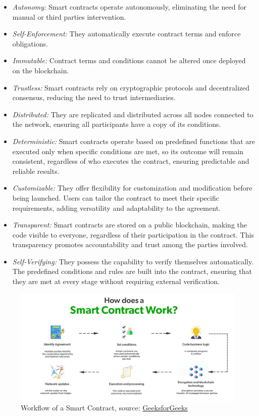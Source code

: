 \begin{itemize}
    \item \textit{Autonomy:} Smart contracts operate autonomously, eliminating the need for manual or third parties intervention.
    \item \textit{Self-Enforcement:} They automatically execute contract terms and enforce obligations.
    \item \textit{Immutable:} Contract terms and conditions cannot be altered once deployed on the blockchain.
    \item \textit{Trustless:} Smart contracts rely on cryptographic protocols and decentralized consensus, reducing the need to trust intermediaries.
    \item \textit{Distributed:} They are replicated and distributed across all nodes connected to the network, ensuring all participants have a copy of its conditions.
    \item \textit{Deterministic:} Smart contracts operate based on predefined functions that are executed only when specific conditions are met, so its outcome will remain consistent, regardless of who executes the contract, ensuring predictable and reliable results.
    \item \textit{Customizable:} They offer flexibility for customization and modification before being launched. Users can tailor the contract to meet their specific requirements, adding versatility and adaptability to the agreement.
    \item \textit{Transparent:} Smart contracts are stored on a public blockchain, making the code visible to everyone, regardless of their participation in the contract. This transparency promotes accountability and trust among the parties involved.
    \item \textit{Self-Verifying:} They possess the capability to verify themselves automatically. The predefined conditions and rules are built into the contract, ensuring that they are met at every stage without requiring external verification.\cite{sc}
    
\end{itemize}


\begin{figure}[htbp]
	\centering
	\includegraphics[scale=0.4]{figures/smart.png}  %
	\caption{Workflow of a Smart Contract, source: \href{https://www.geeksforgeeks.org/smart-contracts-in-blockchain/}{GeeksforGeeks}}
	\label{fig:smartcont}
\end{figure}

